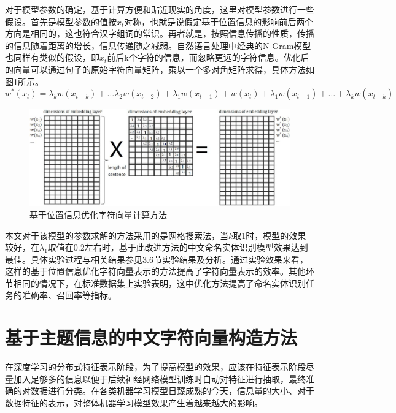 \documentclass[winfonts,master,oneside,nobackinfo]{njuthesis}
\begin{document}
对于模型参数的确定，基于计算方便和贴近现实的角度，这里对模型参数进行一些假设。首先是模型参数的值按$x_{t}$对称，也就是说假定基于位置信息的影响前后两个方向是相同的，这也符合汉字组词的常识。再者就是，按照信息传播的性质，传播的信息随着距离的增长，信息传递随之减弱。自然语言处理中经典的N-Gram模型也同样有类似的假设，即$x_{t}$前后k个字符的信息，而忽略更远的字符信息。优化后的向量可以通过句子的原始字符向量矩阵，乘以一个多对角矩阵求得，具体方法如图\ref{modify-site}所示。
\begin{equation}
w^{*}\left(x_{t}\right)=\lambda_{k} w\left(x_{t-k}\right)+\ldots \lambda_{2}w\left(x_{t-2}\right)+\lambda_{1} w\left(x_{t-1}\right)+ w\left(x_{t}\right)+\lambda_{1} w\left(x_{t+1}\right)+\ldots+\lambda_{k} w\left(x_{t+k}\right)
\end{equation}
\begin{figure}[h]
\centering
\includegraphics[width=1.04\textwidth]{./figure/基于位置信息变化.jpg}
\caption{基于位置信息优化字符向量计算方法}
\label{modify-site}
\end{figure}

本文对于该模型的参数求解的方法采用的是网格搜索法，当$k$取1时，模型的效果较好，在$\lambda_{1}$取值在0.2左右时，基于此改进方法的中文命名实体识别模型效果达到最佳。具体实验过程与相关结果参见3.6节实验结果及分析。通过实验效果来看，这样的基于位置信息优化字符向量表示的方法提高了字符向量表示的效率。其他环节相同的情况下，在标准数据集上实验表明，这中优化方法提高了命名实体识别任务的准确率、召回率等指标。

\section{基于主题信息的中文字符向量构造方法}

在深度学习的分布式特征表示阶段，为了提高模型的效果，应该在特征表示阶段尽量加入足够多的信息以便于后续神经网络模型训练时自动对特征进行抽取，最终准确的对数据进行分类。在各类机器学习模型日臻成熟的今天，信息量的大小、对于数据特征的表示，对整体机器学习模型效果产生着越来越大的影响。
\end{document}
